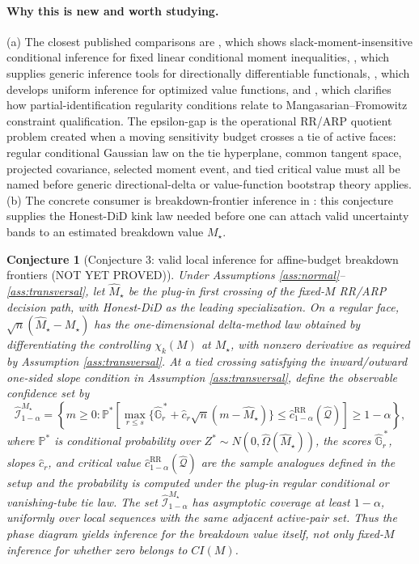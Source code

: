 \documentclass[11pt]{article}
\renewcommand{\Pr}{\mathbb{P}}
\theoremstyle{definition}
\theoremstyle{plain}
\newtheorem{conjecture}{Conjecture}
\theoremstyle{remark}
\begin{document}
\paragraph{Why this is new and worth studying.}
(a) The closest published comparisons are \citet{AndrewsRothPakes2023}, which
shows slack-moment-insensitive conditional inference for fixed linear
conditional moment inequalities, \citet{FangSantos2019}, which supplies
generic inference tools for directionally differentiable functionals,
\citet{FirpoGalvaoParker2023}, which develops uniform inference for optimized
value functions, and \citet{KaidoMolinariStoye2022}, which clarifies how
partial-identification regularity conditions relate to Mangasarian--Fromowitz
constraint qualification.  The epsilon-gap is the operational RR/ARP quotient
problem created when a moving sensitivity budget crosses a tie of active
faces: regular conditional Gaussian law on the tie hyperplane, common tangent
space, projected covariance, selected moment event, and tied critical value
must all be named before generic directional-delta or value-function bootstrap
theory applies.  (b) The concrete consumer is
breakdown-frontier inference in \citet{MastenPoirier2020}: this conjecture
supplies the Honest-DiD kink law needed before one can attach valid
uncertainty bands to an estimated breakdown value \(M_\star\).

\begin{conjecture}[Conjecture 3: valid local inference for affine-budget
breakdown frontiers (NOT YET PROVED)]\label{conj:mstar_inference}
Under Assumptions \ref{ass:normal}--\ref{ass:transversal}, let
\(\widehat M_\star\) be the plug-in first crossing of the fixed-\(M\)
RR/ARP decision path, with Honest-DiD as the leading specialization.  On a
regular face,
\(\sqrt{n}(\widehat M_\star-M_\star)\) has the one-dimensional delta-method
law obtained by differentiating the controlling \(\chi_k(M)\) at
\(M_\star\), with nonzero derivative as required by Assumption
\ref{ass:transversal}.  At a tied crossing satisfying the inward/outward
one-sided slope condition in Assumption \ref{ass:transversal}, define the
observable confidence set by
\[
\widehat{\mathcal{I}}_{1-\alpha}^{M_\star}
=\left\{m\ge 0:
\Pr^\ast\!\left[
\max_{r\le s}\{\widehat{\mathbb{G}}_r^{\,\ast}
+\widehat c_r\sqrt n(m-\widehat M_\star)\}
\le
\widehat c_{1-\alpha}^{\mathrm{RR}}(\widehat{\mathcal{Q}})
\right]\ge 1-\alpha
\right\},
\]
where \(\Pr^\ast\) is conditional probability over
\(Z^\ast\sim N(0,\widehat\Omega(\widehat M_\star))\), the scores
\(\widehat{\mathbb{G}}_r^{\,\ast}\), slopes \(\widehat c_r\), and critical
value \(\widehat c_{1-\alpha}^{\mathrm{RR}}(\widehat{\mathcal{Q}})\) are the
sample analogues defined in the setup and the probability is computed under
the plug-in regular conditional or vanishing-tube tie law.  The set
\(\widehat{\mathcal{I}}_{1-\alpha}^{M_\star}\) has asymptotic coverage at
least \(1-\alpha\), uniformly over local sequences with the same adjacent
active-pair set.  Thus the phase diagram yields inference for the breakdown
value itself, not only fixed-\(M\) inference for whether zero belongs to
\(CI(M)\).
\end{conjecture}
\end{document}
